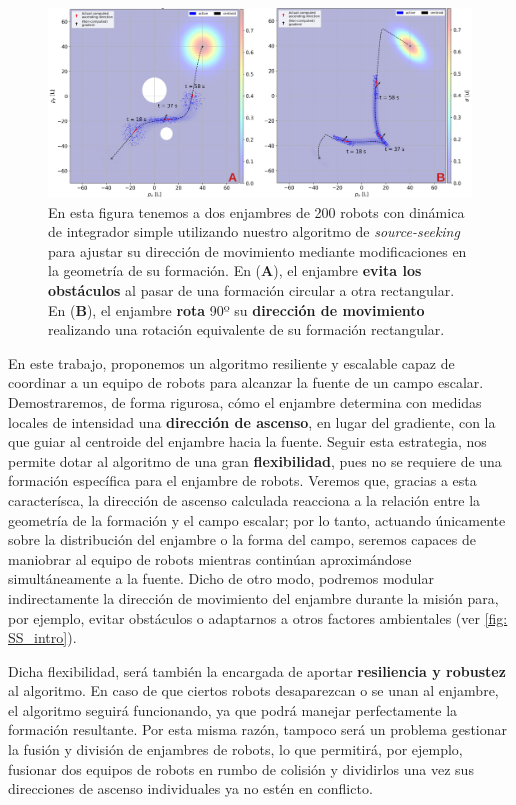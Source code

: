 \begin{figure}[h!]
    \centering
    \includegraphics[trim={0 0cm 0 0cm}, clip, width=1\textwidth]{fig/ss_intro.png}
    \caption{En esta figura tenemos a dos enjambres de 200 robots con dinámica de integrador simple utilizando nuestro algoritmo de \textit{source-seeking} para ajustar su dirección de movimiento mediante modificaciones en la geometría de su formación. En (\textbf{A}), el enjambre \textbf{evita los obstáculos} al pasar de una formación circular a otra rectangular. En (\textbf{B}), el enjambre \textbf{rota} 90º su \textbf{dirección de movimiento} realizando una rotación equivalente de su formación rectangular.}
    \label{fig: SS_intro}
\end{figure}

\newpage

En este trabajo, proponemos un algoritmo resiliente y escalable capaz de coordinar a un equipo de robots para alcanzar la fuente de un campo escalar. Demostraremos, de forma rigurosa, cómo el enjambre determina con medidas locales de intensidad una \textbf{dirección de ascenso}, en lugar del gradiente, con la que guiar al centroide del enjambre hacia la fuente. Seguir esta estrategia, nos permite dotar al algoritmo de una gran \textbf{flexibilidad}, pues no se requiere de una formación específica para el enjambre de robots. Veremos que, gracias a esta caracterísca, la dirección de ascenso calculada reacciona a la relación entre la geometría de la formación y el campo escalar; por lo tanto, actuando únicamente sobre la distribución del enjambre o la forma del campo, seremos capaces de maniobrar al equipo de robots mientras continúan aproximándose simultáneamente a la fuente. Dicho de otro modo, podremos modular indirectamente la dirección de movimiento del enjambre durante la misión para, por ejemplo, evitar obstáculos o adaptarnos a otros factores ambientales (ver \autoref{fig: SS_intro}).

Dicha flexibilidad, será también la encargada de aportar \textbf{resiliencia y robustez} al algoritmo. En caso de que ciertos robots desaparezcan o se unan al enjambre, el algoritmo seguirá funcionando, ya que podrá manejar perfectamente la formación resultante. Por esta misma razón, tampoco será un problema gestionar la fusión y división de enjambres de robots, lo que permitirá, por ejemplo, fusionar dos equipos de robots en rumbo de colisión y dividirlos una vez sus direcciones de ascenso individuales ya no estén en conflicto.

